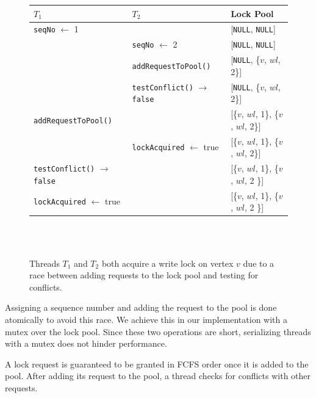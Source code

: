 \begin{figure}
	\centering
	\captionsetup{justification=centering}
	\begin{tabular}{lll}
		\textbf{$T_1$} 					& \textbf{$T_2$} 					& Lock Pool\\
		\hline
		\texttt{seqNo} $\leftarrow$ 1 			&				 			&	[\texttt{NULL}, \texttt{NULL}]	\\
										& \texttt{seqNo} $\leftarrow$ 2		&   [\texttt{NULL}, \texttt{NULL}]		 \\	
										& \texttt{addRequestToPool()}		&	[\texttt{NULL}, \{$v$, $wl$, 2\}]\\
										& \texttt{testConflict()} $\rightarrow$ \texttt{false} &	[\texttt{NULL}, \{$v$, $wl$, 2\}]\\
		\texttt{addRequestToPool()}			&				 			&	[\{$v$, $wl$, 1\}, \{$v$, $wl$, 2\}]\\
		&	\texttt{lockAcquired} $\leftarrow$ true			&	[\{$v$, $wl$, 1\}, \{$v$, $wl$, 2\}]\\
		\texttt{testConflict()} $\rightarrow$ \texttt{false}	&				 			&	[\{$v$, $wl$, 1\}, \{$v$, $wl$, 2 \}]\\
		\texttt{lockAcquired} $\leftarrow$ true		&				 			&	[\{$v$, $wl$, 1\}, \{$v$, $wl$, 2 \}]\\
	\end{tabular} \\~\\
	\caption{Threads $T_1$ and $T_2$ both acquire a write lock on vertex $v$ due to a race between adding requests to the lock pool and testing for conflicts.} \label{fig:raceCondition}
\end{figure}

Assigning a sequence number and adding the request to the pool is done atomically to avoid this race. We achieve this in our implementation with a mutex over the lock pool. Since these two operations are short, serializing threads with a mutex does not hinder performance. 

A lock request is guaranteed to be granted in FCFS order once it is added to the pool. After adding its request to the pool, a thread checks for conflicts with other requests.


